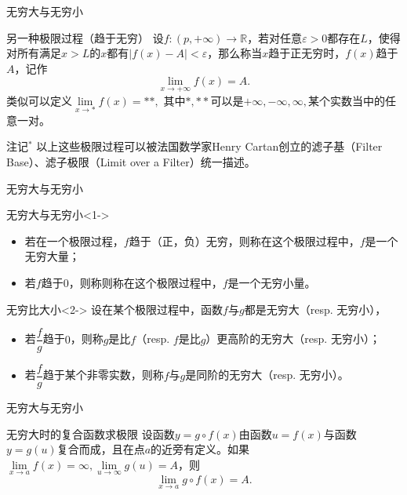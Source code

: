 \begin{frame}{无穷大与无穷小}

\begin{block}{另一种极限过程（趋于无穷）}
设$f:(p,+\infty) \to \mathbb{R}$，若对任意$\varepsilon > 0$都存在$L$，使得对所有满足$x > L$的$x$都有$|f(x)-A| < \varepsilon$，那么称当$x$趋于正无穷时，$f(x)$趋于$A$，记作
$$\lim\limits_{x\to+\infty}f(x) = A.$$
类似可以定义$\lim\limits_{x\to * }f(x) = **,$ 其中$*,**$可以是$+\infty,-\infty,\infty,$某个实数当中的任意一对。
\end{block}

\pause

\begin{block}{注记$^*$}
{\color{zkblue!50}
以上这些极限过程可以被法国数学家Henry Cartan创立的滤子基（Filter Base）、滤子极限（Limit over a Filter）统一描述。
}
\end{block}

\end{frame}


\begin{frame}{无穷大与无穷小}

\begin{block}{无穷大与无穷小}<1->
\begin{itemize}
\item 若在一个极限过程，$f$趋于（正，负）无穷，则称在这个极限过程中，$f$是一个无穷大量；
\item 若$f$趋于$0$，则称则称在这个极限过程中，$f$是一个无穷小量。
\end{itemize}
\end{block}

\begin{block}{无穷比大小}<2->
设在某个极限过程中，函数$f$与$g$都是无穷大（resp. 无穷小），
\begin{itemize}
\item 若$\dfrac{f}{g}$趋于$0$，则称$g$是比$f$（resp. $f$是比$g$）更高阶的无穷大（resp. 无穷小）；
\item 若$\dfrac{f}{g}$趋于某个非零实数，则称$f$与$g$是同阶的无穷大（resp. 无穷小）。
\end{itemize}
\end{block}

\end{frame}


\begin{frame}{无穷大与无穷小}

\begin{block}{无穷大时的复合函数求极限}
设函数$y = g\circ f(x)$由函数$u = f(x)$与函数$y = g(u)$复合而成，且在点$a$的近旁有定义。如果$\lim\limits_{x\to a}f(x) = \infty, \lim\limits_{u\to \infty} g(u) = A$，则
$$\lim\limits_{x\to a} g\circ f(x) = A.$$
\end{block}

\end{frame}

